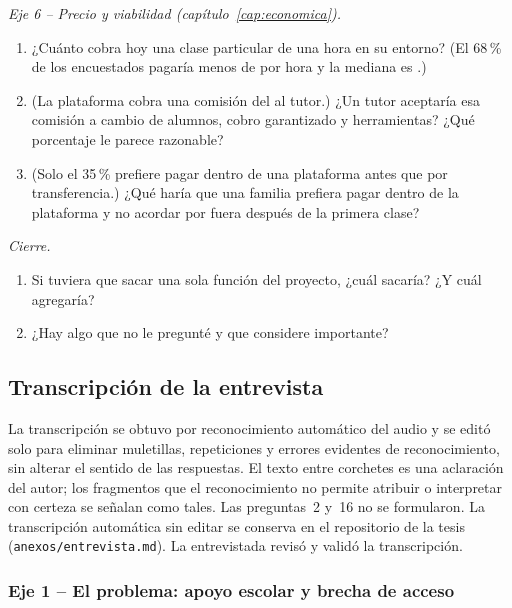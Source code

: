 \emph{Eje 6 -- Precio y viabilidad (capítulo~\ref{cap:economica}).}

\begin{enumerate}[resume]
    \item ¿Cuánto cobra hoy una clase particular de una hora en su
          entorno? (El 68\,\% de los encuestados pagaría menos de
           por hora y la mediana es .)
    \item (La plataforma cobra una comisión del \comision{} al tutor.) ¿Un
          tutor aceptaría esa comisión a cambio de alumnos, cobro
          garantizado y herramientas? ¿Qué porcentaje le parece
          razonable?
    \item (Solo el 35\,\% prefiere pagar dentro de una plataforma antes que
          por transferencia.) ¿Qué haría que una familia prefiera pagar
          dentro de la plataforma y no acordar por fuera después de la
          primera clase?
\end{enumerate}

\emph{Cierre.}

\begin{enumerate}[resume]
    \item Si tuviera que sacar una sola función del proyecto, ¿cuál
          sacaría? ¿Y cuál agregaría?
    \item ¿Hay algo que no le pregunté y que considere importante?
\end{enumerate}

\subsection{Transcripción de la entrevista}

La transcripción se obtuvo por reconocimiento automático del audio y se
editó solo para eliminar muletillas, repeticiones y errores evidentes de
reconocimiento, sin alterar el sentido de las respuestas. El texto entre
corchetes es una aclaración del autor; los fragmentos que el
reconocimiento no permite atribuir o interpretar con certeza se señalan
como tales. Las preguntas~2 y~16 no se formularon. La transcripción
automática sin editar se conserva en el repositorio de la tesis
(\texttt{anexos/entrevista.md}). La entrevistada revisó y validó la
transcripción.

\subsubsection*{Eje 1 -- El problema: apoyo escolar y brecha de acceso}

